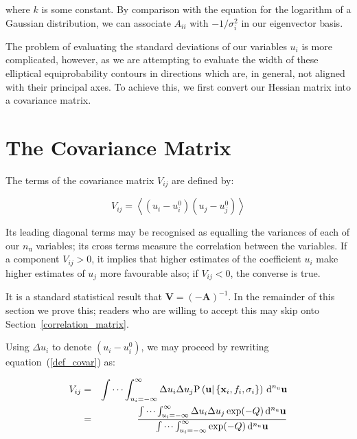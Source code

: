 \documentclass[a4paper,onecolumn,11pt]{book}
\begin{document}
\noindent where $k$ is some constant. By comparison with the equation for the
logarithm of a Gaussian distribution, we can associate $A_{ii}$ with
$-1/\sigma_i^2$ in our eigenvector basis.

The problem of evaluating the standard deviations of our variables $u_i$ is
more complicated, however, as we are attempting to evaluate the width of these
elliptical equiprobability contours in directions which are, in general, not
aligned with their principal axes. To achieve this, we first convert our
Hessian matrix into a covariance matrix.

\section{The Covariance Matrix}

The terms of the covariance matrix $V_{ij}$ are defined by:

\begin{equation}
\label{def_covar}
V_{ij} = \left< \left(u_i - u^0_i\right) \left(u_j - u^0_j\right) \right>
\end{equation}

\noindent Its leading diagonal terms may be recognised as equalling the
variances of each of our $n_\mathrm{u}$ variables; its cross terms measure the
correlation between the variables. If a component $V_{ij} > 0$, it implies that
higher estimates of the coefficient $u_i$ make higher estimates of $u_j$ more
favourable also; if $V_{ij} < 0$, the converse is true.

It is a standard statistical result that $\mathbf{V} = (-\mathbf{A})^{-1}$. In
the remainder of this section we prove this; readers who are willing to accept
this may skip onto Section~\ref{correlation_matrix}.

Using $\Delta u_i$ to denote $\left(u_i - u^0_i\right)$, we may proceed by
rewriting equation~(\ref{def_covar}) as:

\begin{eqnarray}
V_{ij} & = & \idotsint_{u_i=-\infty}^{\infty}
\Delta u_i \Delta u_j
\mathrm{P}\left(
\mathbf{u} | \left\{ \mathbf{x}_i, f_i, \sigma_i \right\} \right)
\,\mathrm{d}^{n_\mathrm{u}}\mathbf{u} \\
 & = & \frac{
\idotsint_{u_i=-\infty}^{\infty} \Delta u_i \Delta u_j \exp(-Q) \,\mathrm{d}^{n_\mathrm{u}}\mathbf{u}
}{
\idotsint_{u_i=-\infty}^{\infty} \exp(-Q) \,\mathrm{d}^{n_\mathrm{u}}\mathbf{u}
}
\nonumber
\end{eqnarray}
\end{document}
